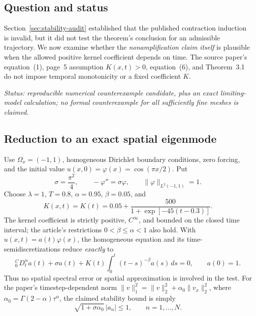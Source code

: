 \documentclass[11pt,a4paper]{amsart}
\theoremstyle{remark}
\theoremstyle{plain}
\theoremstyle{remark}
\newcommand{\auditstatus}[1]{\par\noindent\emph{#1.}\enspace}
\numberwithin{equation}{section}
\begin{document}
\subsection{Question and status}
Section~\ref{sec:stability-audit} established that the published contraction induction is invalid, but it did not test the theorem's conclusion for an admissible trajectory. We now examine whether the \emph{nonamplification claim itself} is plausible when the allowed positive kernel coefficient depends on time. The source paper's equation~(1), page~5 assumption $K(x,t)>0$, equation~(6), and Theorem~3.1 do not impose temporal monotonicity or a fixed coefficient $K$.

\auditstatus{Status: reproducible numerical counterexample candidate, plus an exact limiting-model calculation; no formal counterexample for all sufficiently fine meshes is claimed}

\subsection{Reduction to an exact spatial eigenmode}
Use $\Omega_x=(-1,1)$, homogeneous Dirichlet boundary conditions, zero forcing, and the initial value $u(x,0)=\varphi(x)=\cos(\pi x/2)$. Put
\begin{equation}\label{eq:st04-eigen}
 \sigma=\frac{\pi^2}{4},\qquad
 -\varphi''=\sigma\varphi,\qquad \|\varphi\|_{L^2(-1,1)}=1.
\end{equation}
Choose $\lambda=1$, $T=0.8$, $\alpha=0.95$, $\beta=0.05$, and
\begin{equation}\label{eq:st04-K}
 K(x,t)=K(t)=0.05+\frac{500}{1+\exp[-45(t-0.3)]}.
\end{equation}
The kernel coefficient is strictly positive, $C^\infty$, and bounded on the closed time interval; the article's restrictions $0<\beta\le\alpha<1$ also hold. With $u(x,t)=a(t)\varphi(x)$, the homogeneous equation and its time-semidiscretizations reduce \emph{exactly} to
\begin{equation}\label{eq:st04-scalar}
 {}_0^CD_t^\alpha a(t)+\sigma a(t)
 +K(t)\int_0^t(t-s)^{-\beta}a(s)\,ds=0,
 \qquad a(0)=1.
\end{equation}
Thus no spatial spectral error or spatial approximation is involved in the test.
For the paper's timestep-dependent norm $\|v\|_1^2=\|v\|_2^2+\alpha_0\|v_x\|_2^2$, where $\alpha_0=\Gamma(2-\alpha)\tau^\alpha$, the claimed stability bound is simply
\begin{equation}\label{eq:st04-claimed}
 \sqrt{1+\sigma\alpha_0}\,|a_n|\le 1,
 \qquad n=1,\ldots,N.
\end{equation}
\end{document}
